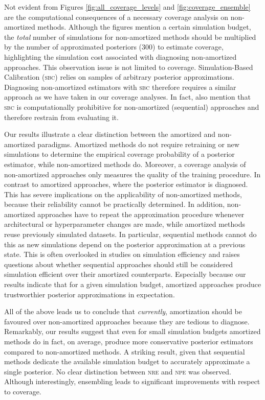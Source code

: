 \documentclass[twoside]{article}
\begin{document}
Not evident from Figures \ref{fig:all_coverage_levels} and \ref{fig:coverage_ensemble}
are the computational consequences of a necessary coverage analysis on non-amortized methods.
Although the figures mention a certain simulation budget, the \emph{total} number of simulations for non-amortized methods should be multiplied by the number of approximated posteriors (300) to estimate coverage, highlighting the simulation cost associated with diagnosing non-amortized approaches.
This observation issue is not limited to coverage. Simulation-Based Calibration (\textsc{sbc}) \citep{sbc} relies on samples of arbitrary posterior approximations.
Diagnosing non-amortized estimators with \textsc{sbc} therefore 
requires a similar approach as we have taken in our coverage analyses.
In fact, \citet{lueckmann2021benchmarking} also mention that \textsc{sbc} is computationally prohibitive for non-amortized (sequential) approaches and therefore restrain from evaluating it.

Our results illustrate a clear distinction between the amortized and non-amortized paradigms. Amortized methods do not require retraining or new simulations to determine the empirical coverage probability of a posterior estimator, while non-amortized methods do.
Moreover, a coverage analysis of non-amortized approaches only measures the quality of the training procedure. In contrast to amortized approaches, where the posterior estimator is diagnosed.
This has severe
implications on the applicability of non-amortized methods, because their reliability cannot be practically determined. In addition, non-amortized approaches have to repeat the approximation procedure whenever architectural or hyperparameter changes are made, while amortized methods reuse previously simulated datasets. In particular, sequential methods cannot do this as new simulations depend on the posterior approximation at a previous state. This is often overlooked in studies on simulation efficiency and raises questions about whether sequential approaches should still be considered simulation efficient over their amortized counterparts. Especially because our results indicate that for a given simulation budget, amortized approaches produce trustworthier posterior approximations in expectation.

All of the above leads us to conclude that \emph{currently}, amortization should be favoured over non-amortized approaches because they are tedious to diagnose. Remarkably, our results suggest that even for small simulation budgets amortized methods do in fact, on average, produce more conservative posterior estimators compared to non-amortized methods.
A striking result, given that sequential methods dedicate the available simulation budget to accurately approximate a single posterior. No clear distinction between \textsc{nre} and \textsc{npe} was observed. Although interestingly, ensembling leads to significant improvements with respect to coverage.
\end{document}
